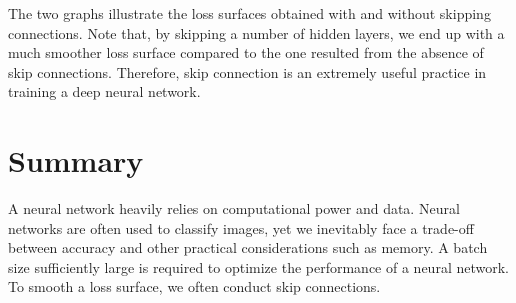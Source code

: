 The two graphs illustrate the loss surfaces obtained with and without skipping connections. Note that, by skipping a number of hidden layers, we end up with a much smoother loss surface compared to the one resulted from the absence of skip connections. Therefore, skip connection is an extremely useful practice in training a deep neural network.
\clearpage

\section{Summary}
A neural network heavily relies on computational power and data. Neural networks are often used to classify images, yet we inevitably face a trade-off between accuracy and other practical considerations such as memory. A batch size sufficiently large is required to optimize the performance of a neural network. To smooth a loss surface, we often conduct skip connections.